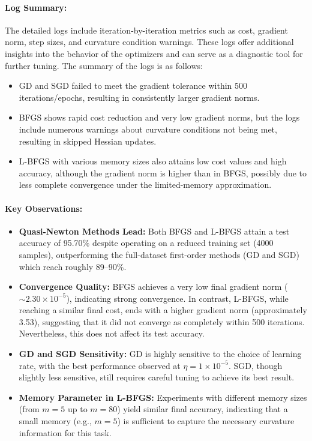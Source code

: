 \documentclass{article}
\begin{document}
\paragraph{Log Summary:}
The detailed logs include iteration-by-iteration metrics such as cost, gradient norm, step sizes, and curvature condition warnings. These logs offer additional insights into the behavior of the optimizers and can serve as a diagnostic tool for further tuning. The summary of the logs is as follows:
\begin{itemize}
  \item GD and SGD failed to meet the gradient tolerance within 500 iterations/epochs, resulting in consistently larger gradient norms.
  \item BFGS shows rapid cost reduction and very low gradient norms, but the logs include numerous warnings about curvature conditions not being met, resulting in skipped Hessian updates.
  \item L-BFGS with various memory sizes also attains low cost values and high accuracy, although the gradient norm is higher than in BFGS, possibly due to less complete convergence under the limited-memory approximation.
\end{itemize}
\paragraph{Key Observations:}
\begin{itemize}
  \item \textbf{Quasi-Newton Methods Lead:} Both BFGS and L-BFGS attain a test accuracy of 95.70\% despite operating on a reduced training set (4000 samples), outperforming the full-dataset first-order methods (GD and SGD) which reach roughly 89--90\%.
  \item \textbf{Convergence Quality:} BFGS achieves a very low final gradient norm ($\sim2.30\times10^{-5}$), indicating strong convergence. In contrast, L-BFGS, while reaching a similar final cost, ends with a higher gradient norm (approximately 3.53), suggesting that it did not converge as completely within 500 iterations. Nevertheless, this does not affect its test accuracy.
  \item \textbf{GD and SGD Sensitivity:} GD is highly sensitive to the choice of learning rate, with the best performance observed at $\eta = 1\times10^{-5}$. SGD, though slightly less sensitive, still requires careful tuning to achieve its best result.
  \item \textbf{Memory Parameter in L-BFGS:} Experiments with different memory sizes (from $m=5$ up to $m=80$) yield similar final accuracy, indicating that a small memory (e.g., $m=5$) is sufficient to capture the necessary curvature information for this task.
\end{itemize}
\end{document}
